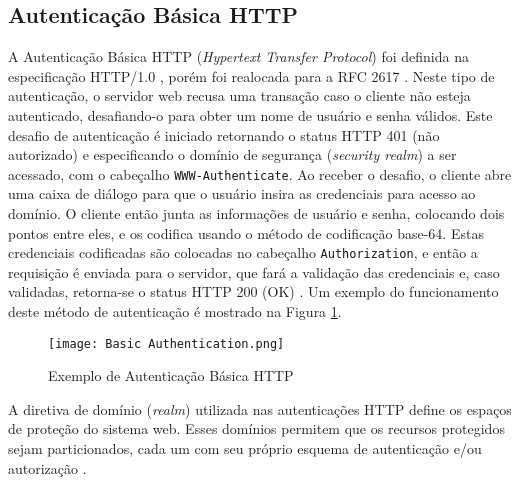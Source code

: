 \subsection{Autenticação Básica HTTP}

A Autenticação Básica HTTP (\emph{Hypertext Transfer Protocol}) foi definida na especificação
HTTP/1.0 \cite{RFC1945}, porém foi realocada para a RFC 2617 \cite{RFC2617}. Neste tipo de
autenticação, o servidor web recusa uma transação caso o cliente não esteja autenticado,
desafiando-o para obter um nome de usuário e senha válidos. Este desafio de autenticação é iniciado
retornando o status HTTP 401 (não autorizado) e especificando o domínio de segurança
(\emph{security realm}) a ser acessado, com o cabeçalho \texttt{WWW-Authenticate}. Ao receber o 
desafio, o cliente abre uma caixa de diálogo para que o usuário insira as credenciais para acesso 
ao domínio. O cliente então junta as informações de usuário e senha, colocando dois pontos entre 
eles, e os codifica usando o método de codificação base-64. Estas credenciais codificadas são 
colocadas no cabeçalho \texttt{Authorization}, e então a requisição é enviada para o servidor, que 
fará a validação das credenciais e, caso validadas, retorna-se o status HTTP 200 (OK) 
\cite{GOURLEY2002}. Um exemplo do funcionamento deste método de autenticação é mostrado na Figura 
\ref{fig:basicAuth}.

\begin{figure}[ht]
  \centering
  \texttt{[image: Basic Authentication.png]}
  \caption{Exemplo de Autenticação Básica HTTP}
  \label{fig:basicAuth}
\end{figure}

A diretiva de domínio (\emph{realm}) utilizada nas autenticações HTTP define os espaços de proteção 
do sistema web. Esses domínios permitem que os recursos protegidos sejam particionados, cada um com 
seu próprio esquema de autenticação e/ou autorização \cite{RFC2617}.

